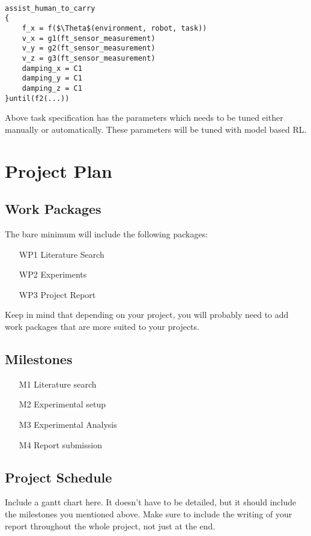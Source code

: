 \documentclass[thesis]{mas_proposal}
\begin{document}
\begin{lstlisting}[label=assist_ts,caption=Task specification for assisting human]

assist_human_to_carry
{
	f_x = f($\Theta$(environment, robot, task))
	v_x = g1(ft_sensor_measurement)
	v_y = g2(ft_sensor_measurement)
	v_z = g3(ft_sensor_measurement)
	damping_x = C1
	damping_y = C1
	damping_z = C1
}until(f2(...))

\end{lstlisting}

Above task specification has the parameters which needs to be tuned either manually or automatically. These parameters will be tuned with model based RL.

\chapter{Project Plan}

\section{Work Packages}
The bare minimum will include the following packages:
\begin{enumerate}
    \item[WP1] Literature Search
    \item[WP2] Experiments
    \item[WP3] Project Report
\end{enumerate}
Keep in mind that depending on your project, you will probably need to add work packages that are more suited to your projects.

\section{Milestones}
\begin{enumerate}
    \item[M1] Literature search
    \item[M2] Experimental setup
    \item[M3] Experimental Analysis
    \item[M4] Report submission
\end{enumerate}

\section{Project Schedule}
Include a gantt chart here. It doesn't have to be detailed, but it should include the milestones you mentioned above.
Make sure to include the writing of your report throughout the whole project, not just at the end.
\end{document}
